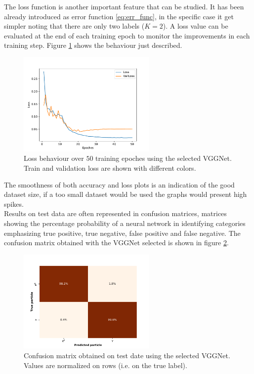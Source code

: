 The loss function is another important feature that can be studied. It has been already introduced as error function \ref{eq:err_func}, in the specific case it get simpler noting that there are only two labels ($K = 2$). A loss value can be evaluated at the end of each training epoch to monitor the improvements in each training step. Figure \ref{fig:VGGNet-loss} shows the behaviour just described.\\

\begin{figure}
	\centering
	\includegraphics[width=0.6\textwidth]{IMG/Cap6/VGGNet-D_Loss.pdf}
	\caption{Loss behaviour over $50$ training epoches using the selected VGGNet. Train and validation loss are shown with different colors.}
	\label{fig:VGGNet-loss}
\end{figure}

The smoothness of both accuracy and loss plots is an indication of the good dataset size, if a too small dataset would be used the graphs would present high spikes.\\

Results on test data are often represented in confusion matrices, matrices showing the percentage probability of a neural network in identifying categories emphasizing true positive, true negative, false positive and false negative. The confusion matrix obtained with the VGGNet selected is shown in figure \ref{fig:VGGNet-cm}.

\begin{figure}
	\centering
	\includegraphics[width=0.6\textwidth]{IMG/Cap6/VGGNet-D_ConfMatrix.pdf}
	\caption{Confusion matrix obtained on test date  using the selected VGGNet. Values are normalized on rows (i.e. on the true label).}
	\label{fig:VGGNet-cm}
\end{figure}

